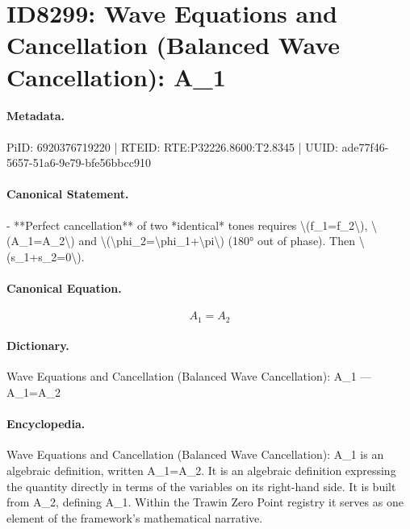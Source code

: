 \section*{ID8299: Wave Equations and Cancellation (Balanced Wave Cancellation): A\_1}
\paragraph{Metadata.}
PiID: 6920376719220 | RTEID: RTE:P32226.8600:T2.8345 | UUID: ade77f46-5657-51a6-9e79-bfe56bbcc910

\paragraph{Canonical Statement.}
- **Perfect cancellation** of two *identical* tones requires \textbackslash{}(f\_1=f\_2\textbackslash{}), \textbackslash{}(A\_1=A\_2\textbackslash{}) and \textbackslash{}(\textbackslash{}phi\_2=\textbackslash{}phi\_1+\textbackslash{}pi\textbackslash{}) (180° out of phase). Then \textbackslash{}(s\_1+s\_2=0\textbackslash{}).

\paragraph{Canonical Equation.}
\[
A_1=A_2
\]

\paragraph{Dictionary.}
Wave Equations and Cancellation (Balanced Wave Cancellation): A\_1 — A\_1=A\_2

\paragraph{Encyclopedia.}
Wave Equations and Cancellation (Balanced Wave Cancellation): A\_1 is an algebraic definition, written A\_1=A\_2. It is an algebraic definition expressing the quantity directly in terms of the variables on its right-hand side. It is built from A\_2, defining A\_1. Within the Trawin Zero Point registry it serves as one element of the framework's mathematical narrative.
